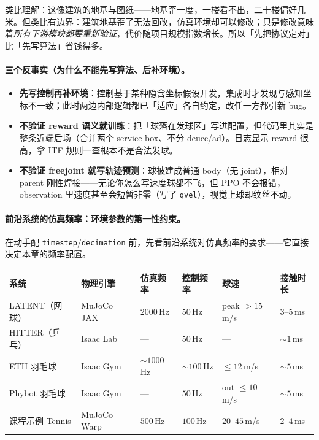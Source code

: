 类比理解：这像建筑的地基与图纸——地基歪一度，一楼看不出，二十楼偏好几米。但类比有边界：建筑地基歪了无法回改，仿真环境却可以修改；只是修改意味着\emph{所有下游模块都要重新验证}，代价随项目规模指数增长。所以「先把协议定对」比「先写算法」省钱得多。

\paragraph{三个反事实（为什么不能先写算法、后补环境）。}
\begin{itemize}
  \item \textbf{先写控制再补环境}：控制基于某种隐含坐标假设开发，集成时才发现与感知坐标不一致；此时两边内部逻辑都已「适应」各自约定，改任一方都引新 bug。
  \item \textbf{不验证 reward 语义就训练}：把「球落在发球区」写进配置，但代码里其实是整条近端后场（合并两个 service box、不分 deuce/ad）。日志显示 reward 很高，拿 ITF 规则一查根本不是合法发球。
  \item \textbf{不验证 freejoint 就写轨迹预测}：球被建成普通 body（无 joint），相对 parent 刚性焊接——无论你怎么写速度球都不飞，但 PPO 不会报错，observation 里速度甚至会短暂非零（写了 \verb|qvel|），视觉上球却纹丝不动。
\end{itemize}

\paragraph{前沿系统的仿真频率：环境参数的第一性约束。}在动手配 \verb|timestep|/\verb|decimation| 前，先看前沿系统对仿真频率的要求——它直接决定本章的频率配置。

\begin{center}
\small
\begin{tabular}{@{}llllll@{}}
\toprule
系统 & 物理引擎 & 仿真频率 & 控制频率 & 球速 & 接触时长 \\
\midrule
LATENT（网球）\cite{tennis_latent2026} & MuJoCo JAX & $2000$\,Hz & $50$\,Hz & peak $>15$\,m/s & $3$--$5$\,ms \\
HITTER（乒乓）\cite{tennis_hitter2025} & Isaac Lab & — & $50$\,Hz & — & $\sim1$\,ms \\
ETH 羽毛球 \cite{tennis_eth2025badminton} & Isaac Gym & $\sim1000$\,Hz & $\sim100$\,Hz & $\le12$\,m/s & $\sim5$\,ms \\
Phybot 羽毛球 \cite{tennis_phybot2025} & Isaac Gym & — & $50$\,Hz & out $\le10$\,m/s & $\sim5$\,ms \\
课程示例 Tennis & MuJoCo Warp & $500$\,Hz & $100$\,Hz & $20$--$45$\,m/s & $2$--$4$\,ms \\
\bottomrule
\end{tabular}
\end{center}

